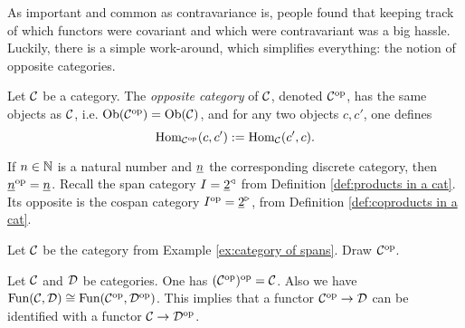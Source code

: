 \documentclass[CT4S-EN-RU]{subfiles}
\begin{document}
\begin{blockRUS}
\end{blockRUS}

\begin{blockENG}
As important and common as contravariance is, people found that keeping track of which functors were covariant and which were contravariant was a big hassle. Luckily, there is a simple work-around, which simplifies everything: the notion of opposite categories.
\end{blockENG}

\begin{blockRUS}
\end{blockRUS}

\begin{definitionENG}
Let $\mathcal{C}$ be a category. The {\em opposite category} of $\mathcal{C}$, denoted $\mathcal{C}^\textnormal{op}$, has the same objects as $\mathcal{C}$, i.e. $\textnormal{Ob}(\mathcal{C}^\textnormal{op})=\textnormal{Ob}(\mathcal{C})$, and for any two objects $c,c'$, one defines
$$\textnormal{Hom}_{\mathcal{C}^\textnormal{op}}(c,c'):=\textnormal{Hom}_\mathcal{C}(c',c).$$
\end{definitionENG}

\begin{definitionRUS}
\end{definitionRUS}

\begin{exampleENG}
If $n\in{\mathbb N}$ is a natural number and $\underline{n}$ the corresponding discrete category, then $\underline{n}^\textnormal{op}=\underline{n}$. Recall  the span category $I=\underline{2}^\triangleleft$ from Definition \ref{def:products in a cat}. Its opposite is the cospan category $I^\textnormal{op}=\underline{2}^\triangleright$, from Definition \ref{def:coproducts in a cat}.
\end{exampleENG}

\begin{exampleRUS}
\end{exampleRUS}

\begin{exerciseENG}
Let $\mathcal{C}$ be the category from Example \ref{ex:category of spans}. Draw $\mathcal{C}^\textnormal{op}$.
\end{exerciseENG}

\begin{exerciseRUS}
\end{exerciseRUS}

\begin{lemmaENG}
Let $\mathcal{C}$ and $\mathcal{D}$ be categories. One has $(\mathcal{C}^\textnormal{op})^\textnormal{op}=\mathcal{C}$. Also we have $\textnormal{Fun}(\mathcal{C},\mathcal{D})\cong\textnormal{Fun}(\mathcal{C}^\textnormal{op},\mathcal{D}^\textnormal{op})$. This implies that a functor $\mathcal{C}^\textnormal{op}\rightarrow\mathcal{D}$ can be identified with a functor $\mathcal{C}\rightarrow\mathcal{D}^\textnormal{op}$.
\end{lemmaENG}
\end{document}
